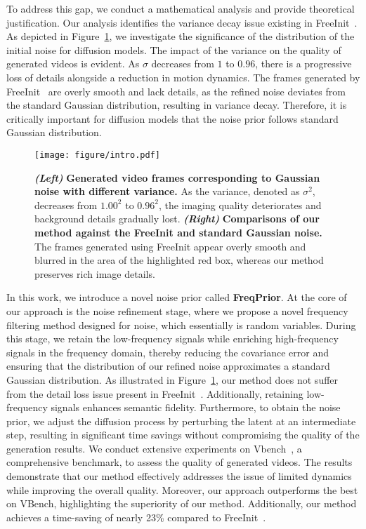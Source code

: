To address this gap, we conduct a mathematical analysis and provide theoretical justification. Our analysis identifies the variance decay issue existing in FreeInit~\citep{wu2023freeinit}.
As depicted in Figure~\ref{fig:sigma}, we investigate the significance of the distribution of the initial noise for diffusion models.
The impact of the variance on the quality of generated videos is evident.
As $\sigma$ decreases from $1$ to $0.96$, there is a progressive loss of details alongside a reduction in motion dynamics.
The frames generated by FreeInit~\citep{wu2023freeinit} are overly smooth and lack details, as the refined noise deviates from the standard Gaussian distribution, resulting in variance decay.
Therefore, it is critically important for diffusion models that the noise prior follows standard Gaussian distribution.


\begin{figure}[t]
  \centering
  \texttt{[image: figure/intro.pdf]}
  \vspace{-10pt}
  \caption{{\bf\em (Left)} {\bf Generated video frames corresponding to Gaussian noise with different variance.} As the variance, denoted as $\sigma^2$, decreases from $1.00^2$ to $0.96^2$, the imaging quality deteriorates and background details gradually lost. 
  {\bf\em (Right)} {\bf Comparisons of our method against the FreeInit and standard Gaussian noise.} The frames generated using FreeInit appear overly smooth and blurred in the area of the highlighted red box, whereas our method preserves rich image details.}
  \vspace{-10pt}
  \label{fig:sigma}
\end{figure}

In this work, we introduce a novel noise prior called \textbf{FreqPrior}.
At the core of our approach is the noise refinement stage, where we propose a novel frequency filtering method designed for noise, which essentially is random variables.
During this stage, we retain the low-frequency signals while enriching high-frequency signals in the frequency domain, 
thereby reducing the covariance error and ensuring that the distribution of our refined noise approximates a standard Gaussian distribution. 
As illustrated in Figure~\ref{fig:sigma}, our method does not suffer from the detail loss issue present in FreeInit~\citep{wu2023freeinit}. 
Additionally, retaining low-frequency signals enhances semantic fidelity. 
Furthermore, to obtain the noise prior, we adjust the diffusion process by perturbing the latent at an intermediate step,  resulting in significant time savings without compromising the quality of the generation results.
We conduct extensive experiments on Vbench~\citep{huang2023vbench}, a comprehensive benchmark, to assess the quality of generated videos. 
The results demonstrate that our method effectively addresses the issue of limited dynamics while improving the overall quality. 
Moreover, our approach outperforms the best on VBench, highlighting the superiority of our method.
Additionally, our method achieves a time-saving of nearly 23\% compared to FreeInit~\citep{wu2023freeinit}. 

